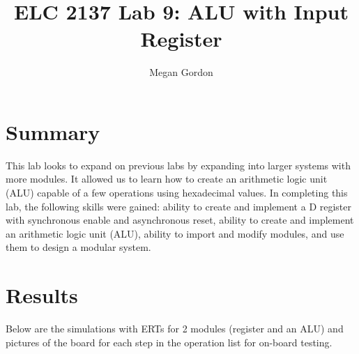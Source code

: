 \documentclass[11pt]{article}
\begin{document}
\title{ELC 2137 Lab 9: ALU with Input Register}
\author{Megan Gordon}

\maketitle


\section*{Summary}

This lab looks to expand on previous labs by expanding into larger systems with more modules. It allowed us to learn how to create an arithmetic logic unit (ALU) capable of a few operations using hexadecimal values. In completing this lab, the following skills were gained: ability to create and implement a D register with synchronous enable and asynchronous reset, ability to create and implement an arithmetic logic unit (ALU), ability to import and modify modules, and use them to design a modular system. 



\section*{Results}

Below are the simulations with ERTs for 2 modules (register and an ALU) and pictures of the board for each step in the operation list for on-board testing. 
\medskip
\end{document}
